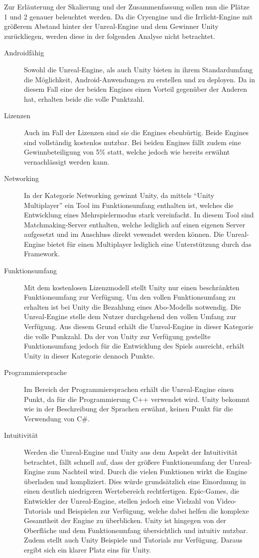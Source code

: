 	Zur Erläuterung der Skalierung und der Zusammenfassung sollen nun die Plätze 1 und 2 genauer beleuchtet werden.
	Da die Cryengine und die Irrlicht-Engine mit größerem Abstand hinter der Unreal-Engine und dem Gewinner Unity zurückliegen, werden diese in der folgenden Analyse nicht betrachtet.
	\begin{description}
		\item[Androidfähig]{Sowohl die Unreal-Engine, als auch Unity bieten in ihrem Standardumfang die Möglichkeit, Android-Anwendungen zu erstellen und zu deployen. Da in diesem Fall eine der beiden Engines einen Vorteil gegenüber der Anderen hat, erhalten beide die volle Punktzahl.}
		\item[Lizenzen]{Auch im Fall der Lizenzen sind sie die Engines ebenbürtig. Beide Engines sind vollständig kostenlos nutzbar. Bei beiden Engines fällt zudem eine Gewinnbeteiligung von 5\% statt, welche jedoch wie bereits erwähnt vernachlässigt werden kann.}
		\item[Networking]{In der Kategorie Networking gewinnt Unity, da mittels \enquote{Unity Multiplayer} ein Tool im Funktionsumfang enthalten ist, welches die Entwicklung eines Mehrspielermodus stark vereinfacht. In diesem Tool sind Matchmaking-Server enthalten, welche lediglich auf einen eigenen Server aufgesetzt und im Anschluss direkt vewendet werden können. Die Unreal-Engine bietet für einen Multiplayer lediglich eine Unterstützung durch das Framework.}
		\item[Funktionsumfang]{Mit dem kostenlosen Lizenzmodell stellt Unity nur einen beschränkten Funktionsumfang zur Verfügung. Um den vollen Funktionsumfang zu erhalten ist bei Unity die Bezahlung eines Abo-Modells notwendig. Die Unreal-Engine stelle dem Nutzer durchgehend den vollen Umfang zur Verfügung. Aus diesem Grund erhält die Unreal-Engine in dieser Kategorie die volle Punkzahl. Da der von Unity zur Verfügung gestellte Funktionsumfang jedoch für die Entwicklung des Spiels ausreicht, erhält Unity in dieser Kategorie dennoch Punkte.}
		\item[Programmiersprache]{Im Bereich der Programmiersprachen erhält die Unreal-Engine einen Punkt, da für die Programmierung C++ verwendet wird. Unity bekommt wie in der Beschreibung der Sprachen erwähnt, keinen Punkt für die Verwendung von C\#.}
		\item[Intuitivität]{Werden die Unreal-Engine und Unity aus dem Aspekt der Intuitivität betrachtet, fällt schnell auf, dass der größere Funktionsumfang der Unreal-Engine zum Nachteil wird. Durch die vielen Funktionen wirkt die Engine überladen und kompliziert. Dies würde grundsätzlich eine Einordnung in einen deutlich niedrigeren Wertebereich rechtfertigen. Epic-Games, die Entwickler der Unreal-Engine, stellen jedoch eine Vielzahl von Video-Tutorials und Beispielen zur Verfügung, welche dabei helfen die komplexe Gesamtheit der Engine zu überblicken. Unity ist hingegen von der Oberfläche und dem Funktionsumfang übersichtlich und intuitiv nutzbar. Zudem stellt auch Unity Beispiele und Tutorials zur Verfügung. Daraus ergibt sich ein klarer Platz eins für Unity.}

\end{description}
